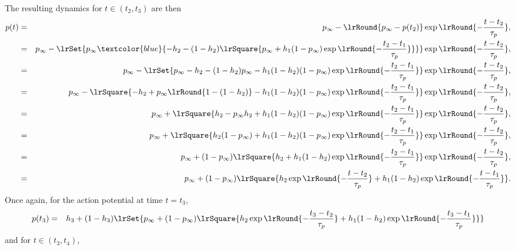 \documentclass[11pt,landscape]{article}
\begin{document}
The resulting dynamics for $t \in (t_2,t_3)$ are then
\begin{eqnarray}
p(t) 
&=& 
p_{\infty} - \lrRound{p_{\infty} - p(t_2) }\exp
\lrRound{-\frac{t-t_2}{\tau_p}},
\nonumber \\
&=& 
p_{\infty} - \lrSet{p_{\infty}   
\textcolor{blue}{-
  h_2 - (1-h_2) \lrSquare{
    p_{\infty} + h_1 (1-p_{\infty}) 
    \exp \lrRound{-\frac{t_2-t_1}{\tau_p}}
}}}
\exp \lrRound{-\frac{t-t_2}{\tau_p}},
\nonumber \\
&=& 
p_{\infty} - \lrSet{p_{\infty} -  
  h_2 - (1-h_2) p_{\infty}
 - h_1  (1-h_2) (1-p_{\infty}) 
    \exp \lrRound{-\frac{t_2-t_1}{\tau_p}}}
\exp \lrRound{-\frac{t-t_2}{\tau_p}},
\nonumber \\
&=& 
p_{\infty} - \lrSquare{
-    h_2  
+
p_{\infty} \lrRound{1 - (1-h_2) }
- h_1 (1-h_2) (1-p_{\infty}) 
    \exp \lrRound{-\frac{t_2-t_1}{\tau_p}}}
\exp \lrRound{-\frac{t-t_2}{\tau_p}},
\nonumber \\
&=& 
p_{\infty} + \lrSquare{
    h_2  
- p_{\infty}  h_2 
+ h_1 (1-h_2) (1-p_{\infty}) 
    \exp \lrRound{-\frac{t_2-t_1}{\tau_p}}}
\exp \lrRound{-\frac{t-t_2}{\tau_p}},
\nonumber \\
&=& 
p_{\infty} + \lrSquare{
    h_2  (1- p_{\infty})
+ h_1 (1-h_2) (1-p_{\infty}) 
    \exp \lrRound{-\frac{t_2-t_1}{\tau_p}}}
\exp \lrRound{-\frac{t-t_2}{\tau_p}},
\nonumber \\
&=& 
p_{\infty} + (1- p_{\infty}) \lrSquare{
    h_2  
+ h_1 (1-h_2)  
    \exp \lrRound{-\frac{t_2-t_1}{\tau_p}}}
\exp \lrRound{-\frac{t-t_2}{\tau_p}},
\nonumber \\
&=& 
p_{\infty} + (1- p_{\infty}) \lrSquare{
    h_2  \exp \lrRound{-\frac{t-t_2}{\tau_p}}
+ h_1 (1-h_2)  
    \exp \lrRound{-\frac{t-t_1}{\tau_p}}}.
\end{eqnarray}
\newpage
Once again, for the action potential at time $t=t_3$,
\begin{eqnarray}
p(t_3) &=& h_3 + (1-h_3)
\lrSet{p_{\infty} + (1-p_{\infty})  \lrSquare{ 
h_2 \exp \lrRound{-\frac{t_3-t_2}{\tau_p}}
 + h_1 (1-h_2) 
    \exp \lrRound{-\frac{t_3-t_1}{\tau_p}} }}
\end{eqnarray}
and for $t \in (t_3,t_4)$, 
\end{document}
